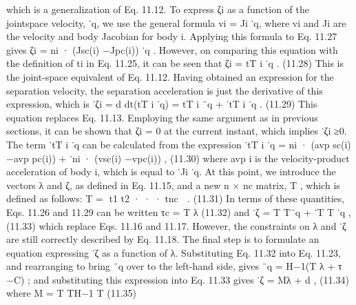 which is a generalization of Eq. 11.12. To express ζi as a function of the jointspace velocity, ˙q, we use the general formula vi = Ji ˙q, where vi and Ji are the velocity and body Jacobian for body i. Applying this formula to Eq. 11.27 gives ζi = ni · (Jsc(i) −Jpc(i)) ˙q . However, on comparing this equation with the definition of ti in Eq. 11.25, it can be seen that ζi = tT i ˙q . (11.28) This is the joint-space equivalent of Eq. 11.12. Having obtained an expression for the separation velocity, the separation acceleration is just the derivative of this expression, which is ˙ζi = d dt(tT i ˙q) = tT i ¨q + ˙tT i ˙q . (11.29) This equation replaces Eq. 11.13. Employing the same argument as in previous sections, it can be shown that ζi = 0 at the current instant, which implies ˙ζi ≥0. The term ˙tT i ˙q can be calculated from the expression ˙tT i ˙q = ni · (avp sc(i) −avp pc(i)) + ˙ni · (vsc(i) −vpc(i)) , (11.30) where avp i is the velocity-product acceleration of body i, which is equal to ˙Ji ˙q. At this point, we introduce the vectors λ and ζ, as defined in Eq. 11.15, and a new n × nc matrix, T , which is defined as follows: T = t1 t2 · · · tnc  . (11.31) In terms of these quantities, Eqs. 11.26 and 11.29 can be written τc = T λ (11.32) and ˙ζ = T T¨q + ˙T T ˙q , (11.33) which replace Eqs. 11.16 and 11.17. However, the constraints on λ and ˙ζ are still correctly described by Eq. 11.18. The final step is to formulate an equation expressing ˙ζ as a function of λ. Substituting Eq. 11.32 into Eq. 11.23, and rearranging to bring ¨q over to the left-hand side, gives ¨q = H−1(T λ + τ −C) ; and substituting this expression into Eq. 11.33 gives ˙ζ = Mλ + d , (11.34) where M = T TH−1 T (11.35)

